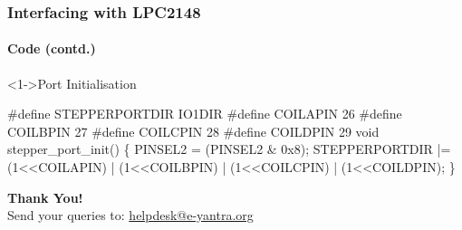 \documentclass[table,10pt,red]{beamer}	%
\begin{document}
\begin{frame}[shrink = 2,fragile]
	\frametitle{Interfacing with LPC2148}
	\framesubtitle{Code (contd.)}

	\begin{block}<1->{Port Initialisation}
		\begin{semiverbatim}
			\scriptsize{
\#define STEPPERPORTDIR IO1DIR
\#define COILAPIN 26
\#define COILBPIN 27
\#define COILCPIN 28
\#define COILDPIN 29
void stepper\_port\_init()
\{
    PINSEL2 = (PINSEL2 \& 0x8);
    STEPPERPORTDIR |= (1<<COILAPIN) | (1<<COILBPIN) |
        (1<<COILCPIN) | (1<<COILDPIN);
\}
			}
		\end{semiverbatim}
	\end{block}
\end{frame}


\begin{frame}
	\begin{center}
		\textbf{\LARGE Thank You!} \\
		\vspace{20pt}
		\scriptsize Send your queries to: 
		\href{mailto:helpdesk@e-yantra.org} {\color{blue}helpdesk@e-yantra.org \color{black}}
	\end{center}
\end{frame}
\end{document}

